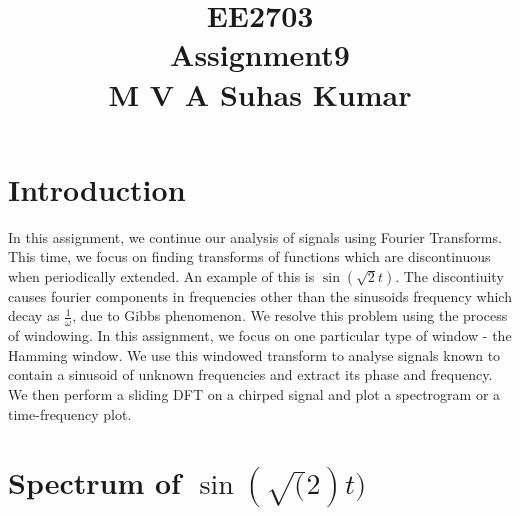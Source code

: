 \documentclass[11pt]{article}
\title{EE2703\\ Assignment9 \\ M V A Suhas Kumar}
\begin{document}
    
    
    \maketitle
    
    

    
    \section{Introduction}\label{introduction}

In this assignment, we continue our analysis of signals using Fourier
Transforms. This time, we focus on finding transforms of functions which
are discontinuous when periodically extended. An example of this is
\(\sin(\sqrt{2} t)\). The discontiuity causes fourier components in
frequencies other than the sinusoids frequency which decay as
\(\frac{1}{\omega}\), due to Gibbs phenomenon. We resolve this problem
using the process of windowing. In this assignment, we focus on one
particular type of window - the Hamming window. We use this windowed
transform to analyse signals known to contain a sinusoid of unknown
frequencies and extract its phase and frequency. We then perform a
sliding DFT on a chirped signal and plot a spectrogram or a
time-frequency plot.

    \section{\texorpdfstring{Spectrum of
\(\sin(\sqrt(2)t)\)}{Spectrum of \textbackslash{}sin(\textbackslash{}sqrt(2)t)}}\label{spectrum-of-sinsqrt2t}
\end{document}
